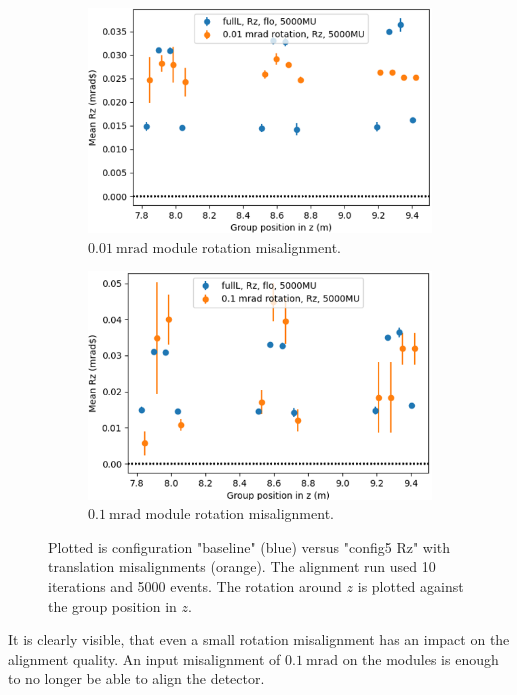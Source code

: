 \begin{figure}
  \centering
  \begin{subfigure}[b]{0.4\textwidth}
    \centering
    \includegraphics[width=\textwidth]{plots/misalign_rota/001_rot_Rz.png}
    \caption{$\SI{0.01}{\milli\radian}$ module rotation misalignment.}
    \label{fig:001Rz}
  \end{subfigure}
  \hfill
  \begin{subfigure}[b]{0.4\textwidth}
    \centering
    \includegraphics[width=\textwidth]{plots/misalign_rota/01_rot_Rz.png}
    \caption{$\SI{0.1}{\milli\radian}$ module rotation misalignment.}
    \label{fig:01Rz}
  \end{subfigure}
  \caption{Plotted is configuration "baseline" (blue) versus "config5 Rz" with translation misalignments (orange). The alignment run used 10 iterations and 5000 events. The rotation around $z$ is plotted against the group position in $z$.}
  \label{fig:mis_rot_Rz}
\end{figure}

It is clearly visible, that even a small rotation misalignment has an impact on the alignment quality. An input misalignment of $\SI{0.1}{\milli\radian}$ on the modules is enough to no longer be able to align the detector.
